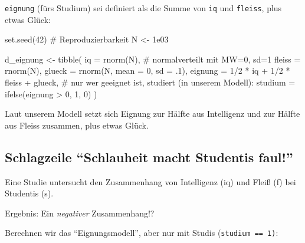 \documentclass[
  a4paper,
  DIV=11]{scrreprt}
\newenvironment{Shaded}{\begin{snugshade}}{\end{snugshade}}
\newcommand{\AttributeTok}[1]{\textcolor[rgb]{0.40,0.45,0.13}{#1}}
\newcommand{\CommentTok}[1]{\textcolor[rgb]{0.37,0.37,0.37}{#1}}
\newcommand{\DecValTok}[1]{\textcolor[rgb]{0.68,0.00,0.00}{#1}}
\newcommand{\FloatTok}[1]{\textcolor[rgb]{0.68,0.00,0.00}{#1}}
\newcommand{\FunctionTok}[1]{\textcolor[rgb]{0.28,0.35,0.67}{#1}}
\newcommand{\NormalTok}[1]{\textcolor[rgb]{0.00,0.23,0.31}{#1}}
\newcommand{\OtherTok}[1]{\textcolor[rgb]{0.00,0.23,0.31}{#1}}
\newcommand{\SpecialCharTok}[1]{\textcolor[rgb]{0.37,0.37,0.37}{#1}}
\theoremstyle{definition}
\theoremstyle{remark}
\begin{document}
\texttt{eignung} (fürs Studium) sei definiert als die Summe von
\texttt{iq} und \texttt{fleiss}, plus etwas Glück:

\begin{Shaded}
\begin{Highlighting}[]
\FunctionTok{set.seed}\NormalTok{(}\DecValTok{42}\NormalTok{)  }\CommentTok{\# Reproduzierbarkeit}
\NormalTok{N }\OtherTok{\textless{}{-}} \FloatTok{1e03}  

\NormalTok{d\_eignung }\OtherTok{\textless{}{-}}
\FunctionTok{tibble}\NormalTok{(}
  \AttributeTok{iq =} \FunctionTok{rnorm}\NormalTok{(N),  }\CommentTok{\# normalverteilt mit MW=0, sd=1}
  \AttributeTok{fleiss =} \FunctionTok{rnorm}\NormalTok{(N),}
  \AttributeTok{glueck =} \FunctionTok{rnorm}\NormalTok{(N, }\AttributeTok{mean =} \DecValTok{0}\NormalTok{, }\AttributeTok{sd =}\NormalTok{ .}\DecValTok{1}\NormalTok{),}
  \AttributeTok{eignung =} \DecValTok{1}\SpecialCharTok{/}\DecValTok{2} \SpecialCharTok{*}\NormalTok{ iq }\SpecialCharTok{+} \DecValTok{1}\SpecialCharTok{/}\DecValTok{2} \SpecialCharTok{*}\NormalTok{ fleiss }\SpecialCharTok{+}\NormalTok{ glueck,}
  \CommentTok{\# nur wer geeignet ist, studiert (in unserem Modell):}
  \AttributeTok{studium =} \FunctionTok{ifelse}\NormalTok{(eignung }\SpecialCharTok{\textgreater{}} \DecValTok{0}\NormalTok{, }\DecValTok{1}\NormalTok{, }\DecValTok{0}\NormalTok{) }
\NormalTok{  )}
\end{Highlighting}
\end{Shaded}

Laut unserem Modell setzt sich Eignung zur Hälfte aus Intelligenz und
zur Hälfte aus Fleiss zusammen, plus etwas Glück.

\hypertarget{schlagzeile-schlauheit-macht-studentis-faul}{%
\subsection{Schlagzeile ``Schlauheit macht Studentis
faul!''}\label{schlagzeile-schlauheit-macht-studentis-faul}}

Eine Studie untersucht den Zusammenhang von Intelligenz (iq) und Fleiß
(f) bei Studentis (s).

Ergebnis: Ein \emph{negativer} Zusammenhang!?

Berechnen wir das ``Eignungsmodell'', aber nur mit Studis
(\texttt{studium\ ==\ 1)}:
\end{document}
